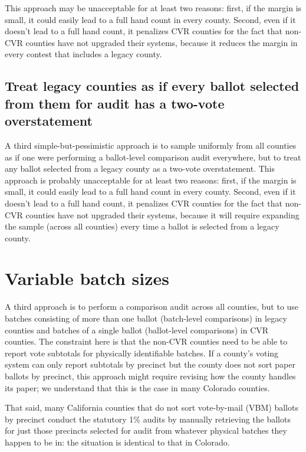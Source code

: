 \documentclass[12pt]{article}
\begin{document}
This approach may be unacceptable for at least two reasons:
first, if the margin is small, it could easily lead to a full hand count in every county.
Second, even if it doesn't lead to a full hand count, it penalizes CVR counties for the
fact that non-CVR counties have not upgraded their systems, because it reduces the
margin in every contest that includes a legacy county. 

\subsection{Treat legacy counties as if every ballot selected from them for audit has a two-vote overstatement}
A third simple-but-pessimistic approach is to sample uniformly from all counties as if one
were performing a ballot-level comparison audit everywhere,  but to 
treat any ballot
selected from a legacy county as a two-vote overstatement.
This approach is probably unacceptable for at least two reasons:
first, if the margin is small, it could easily lead to a full hand count in every county.
Second, even if it doesn't lead to a full hand count, it penalizes CVR counties for the
fact that non-CVR counties have not upgraded their systems, because it will require expanding
the sample (across all counties) every time a ballot is selected from a legacy county.


\section{Variable batch sizes}

A third approach is to perform a comparison audit across all counties, but to use batches consisting
of more than one ballot (batch-level comparisons)
in legacy counties and batches of a single ballot (ballot-level comparisons) in CVR counties.
The constraint here is that the non-CVR counties need to be able to report vote subtotals
for physically identifiable batches.
If a county's voting system can only report subtotals by precinct but 
the county does not sort paper ballots by
precinct, this approach might require revising how the county handles its
paper; we understand that this is the case in many Colorado counties.

That said, many California counties that do not sort vote-by-mail (VBM)
ballots by precinct conduct the statutory 1\% audits by manually retrieving the ballots 
for just those precincts selected for audit from whatever physical batches they happen to be in: 
the situation is identical to that in Colorado.
\end{document}
